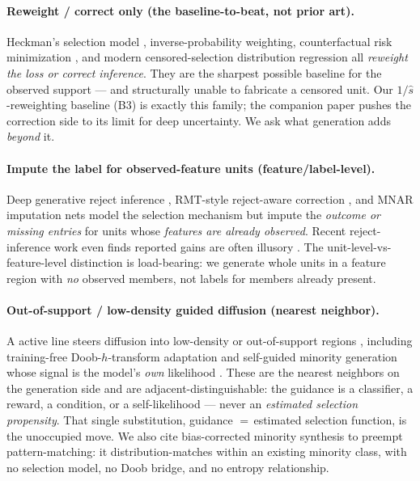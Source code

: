 \documentclass[10pt]{article}
\newcommand{\shat}{\hat s}
\begin{document}
\paragraph{Reweight / correct only (the baseline-to-beat, not prior art).}
Heckman's selection model \citep{heckman1979,tobin1958}, inverse-probability
weighting, counterfactual risk minimization \citep{swaminathan2015}, and modern
censored-selection distribution regression \citep{distreg2025} all
\emph{reweight the loss or correct inference}. They are the sharpest possible
baseline for the observed support --- and structurally unable to fabricate a
censored unit. Our $1/\shat$-reweighting baseline (B3) is exactly this family;
the companion paper \citep{howe2026heckman} pushes the correction side to its
limit for deep uncertainty. We ask what generation adds \emph{beyond} it.

\paragraph{Impute the label for observed-feature units (feature/label-level).}
Deep generative reject inference \citep{mancisidor2020}, RMT-style reject-aware
correction \citep{rmtnet2022}, and MNAR imputation nets
\citep{ipsen2021notmiwae,gnr2023} model the selection mechanism but impute the
\emph{outcome or missing entries} for units whose \emph{features are already
observed}. Recent reject-inference work even finds reported gains are often
illusory \citep{rejectillusion2026}. The unit-level-vs-feature-level distinction
is load-bearing: we generate whole units in a feature region with \emph{no}
observed members, not labels for members already present.

\paragraph{Out-of-support / low-density guided diffusion (nearest neighbor).}
A active line steers diffusion into low-density or out-of-support regions
\citep{selfguided2024,steinguidance2025,lowdensity2026,doobtrainingfree2026},
including training-free Doob-$h$-transform adaptation \citep{doobtrainingfree2026}
and self-guided minority generation whose signal is the model's \emph{own}
likelihood \citep{selfguided2024}. These are the nearest neighbors on the
generation side and are adjacent-distinguishable: the guidance is a classifier,
a reward, a condition, or a self-likelihood --- never an \emph{estimated
selection propensity}. That single substitution, guidance $=\,$estimated
selection function, is the unoccupied move. We also cite bias-corrected minority
synthesis \citep{biascorrsynth2025} to preempt pattern-matching: it
distribution-matches within an existing minority class, with no selection model,
no Doob bridge, and no entropy relationship.
\end{document}
